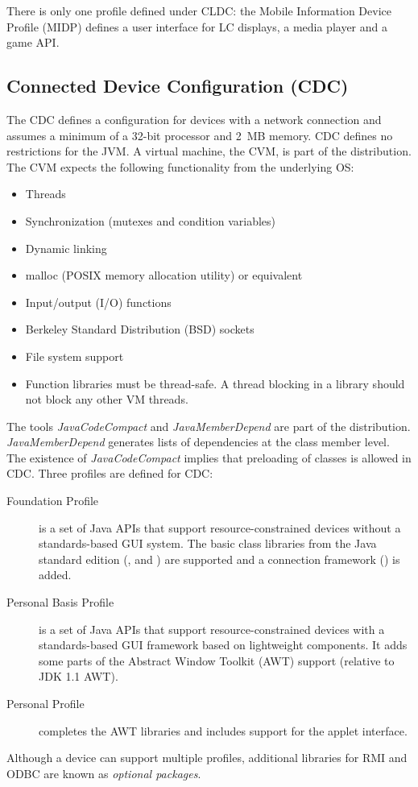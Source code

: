 There is only one profile defined under CLDC: the Mobile Information
Device Profile (MIDP) defines a user interface for LC displays,
a media player and a game API.

\subsection{Connected Device Configuration (CDC)}

The CDC defines a configuration for devices with a network connection
and assumes a minimum of a 32-bit processor and 2~MB memory. CDC
defines no restrictions for the JVM. A virtual machine, the CVM, is
part of the distribution. The CVM expects the following functionality
from the underlying OS:
%
\begin{itemize}
    \item Threads
    \item Synchronization (mutexes and condition variables)
    \item Dynamic linking
    \item malloc (POSIX memory allocation utility) or equivalent
    \item Input/output (I/O) functions
    \item Berkeley Standard Distribution (BSD) sockets
    \item File system support
    \item Function libraries must be thread-safe. A thread blocking in a library should not block any other VM threads.
\end{itemize}
%
The tools \textit{JavaCodeCompact} and \textit{JavaMemberDepend} are
part of the distribution. \textit{JavaMemberDepend} generates lists
of dependencies at the class member level. The existence of
\textit{JavaCodeCompact} implies that preloading of classes is
allowed in CDC. Three profiles are defined for CDC:
%
\begin{description}
    \item[Foundation Profile] is a set of Java APIs that support resource-constrained
devices without a standards-based GUI system. The basic class
libraries from the Java standard edition (,
 and ) are supported and a connection
framework () is added.

    \item[Personal Basis Profile] is a set of Java APIs that support
resource-constrained devices with a standards-based GUI framework
based on lightweight components. It adds some parts of the Abstract
Window Toolkit (AWT) support (relative to JDK 1.1 AWT).

    \item[Personal Profile] completes the AWT libraries and includes support for the
applet interface.

\end{description}
%
Although a device can support multiple profiles, additional libraries
for RMI and ODBC are known as \textit{optional packages}.

